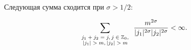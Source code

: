 \begin{lemma}[8]Следующая сумма сходится при $\sigma>1/2{:}$

$$

\sum_{

\scriptsize

\begin{array}{c}

j_1+j_2=j,j\in \mathbb Z_0, \\ |j_1|>m, |j_2|> m

\end{array}

} \frac{m^{2\sigma}}{|j_1|^{2\sigma}|j_2|^{2\sigma}}<\infty.

$$

\end{lemma}



